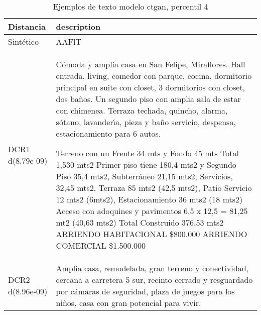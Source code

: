 \begin{table}[H]
\centering
\fontsize{10}{14}\selectfont
\caption{Ejemplos de texto modelo ctgan, percentil 4}
\label{table-example-economicos-b-2-ctgan-4p-text}
\begin{tabular}{|l|m{35em}|}
\hline
\rowcolor[gray]{0.8}
Distancia & description \\
\hline Sintético & AAFlT \\
\hline DCR1 d(8.79e-09) & C\'omoda y amplia casa en San Felipe, Miraflores.
Hall entrada, living, comedor con parque, cocina, dormitorio principal en suite con closet, 3 dormitorios con closet, dos ba\~nos. Un segundo piso con amplia sala de estar con chimenea.
Terraza techada, quincho, alarma, s\'otano, lavander{\'\i}a, pieza y ba\~no servicio, despensa, estacionamiento para 6 autos.

Terreno con un Frente 34 mts y Fondo 45 mts Total 1,530 mts2
Primer piso tiene 180,4 mts2 y Segundo Piso 35,4 mts2, Subterr\'aneo 21,15 mts2, Servicios, 32,45 mts2, Terraza 85 mts2 (42,5 mts2), Patio Servicio 12 mts2 (6mts2), Estacionamiento 36 mts2 (18 mts2)
Acceso con adoquines y pavimentos 6,5 x 12,5 = 81,25 mt2 (40,63 mts2)
Total Construido 376,53 mts2
ARRIENDO HABITACIONAL \$800.000
ARRIENDO COMERCIAL \$1.500.000
 \\
\hline DCR2 d(8.96e-09) & Amplia casa, remodelada, gran terreno y conectividad, cercana a carretera 5 sur, recinto cerrado y resguardado por c\'amaras de seguridad, plaza de juegos para los ni\~nos, casa con gran potencial para vivir. \\
\hline
\end{tabular}
\end{table}

